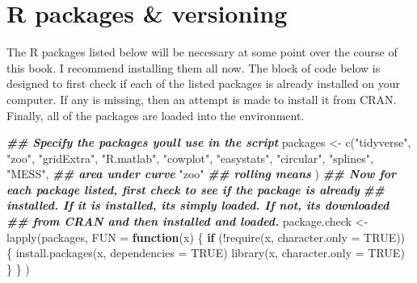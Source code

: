 \documentclass[
]{book}
\newenvironment{Shaded}{\begin{snugshade}}{\end{snugshade}}
\newcommand{\AttributeTok}[1]{\textcolor[rgb]{0.77,0.63,0.00}{#1}}
\newcommand{\ConstantTok}[1]{\textcolor[rgb]{0.00,0.00,0.00}{#1}}
\newcommand{\ControlFlowTok}[1]{\textcolor[rgb]{0.13,0.29,0.53}{\textbf{#1}}}
\newcommand{\DocumentationTok}[1]{\textcolor[rgb]{0.56,0.35,0.01}{\textbf{\textit{#1}}}}
\newcommand{\FunctionTok}[1]{\textcolor[rgb]{0.00,0.00,0.00}{#1}}
\newcommand{\NormalTok}[1]{#1}
\newcommand{\OtherTok}[1]{\textcolor[rgb]{0.56,0.35,0.01}{#1}}
\newcommand{\SpecialCharTok}[1]{\textcolor[rgb]{0.00,0.00,0.00}{#1}}
\newcommand{\StringTok}[1]{\textcolor[rgb]{0.31,0.60,0.02}{#1}}
\begin{document}
\hypertarget{r-packages-versioning}{%
\section{R packages \& versioning}\label{r-packages-versioning}}

The R packages listed below will be necessary at some point over the course of
this book. I recommend installing them all now. The block of code below is
designed to first check if each of the listed packages is already installed on
your computer. If any is missing, then an attempt is made to install it from
CRAN. Finally, all of the packages are loaded into the environment.

\begin{Shaded}
\begin{Highlighting}[]
\DocumentationTok{\#\# Specify the packages you\textquotesingle{}ll use in the script}
\NormalTok{packages }\OtherTok{\textless{}{-}} \FunctionTok{c}\NormalTok{(}\StringTok{"tidyverse"}\NormalTok{,}
              \StringTok{"zoo"}\NormalTok{,}
              \StringTok{"gridExtra"}\NormalTok{,}
              \StringTok{"R.matlab"}\NormalTok{,}
              \StringTok{"cowplot"}\NormalTok{,}
              \StringTok{"easystats"}\NormalTok{,}
              \StringTok{"circular"}\NormalTok{,}
              \StringTok{"splines"}\NormalTok{,}
              \StringTok{"MESS"}\NormalTok{, }\DocumentationTok{\#\# area under curve}
              \StringTok{"zoo"} \DocumentationTok{\#\# rolling means}
\NormalTok{)}
\DocumentationTok{\#\# Now for each package listed, first check to see if the package is already}
\DocumentationTok{\#\# installed. If it is installed, it\textquotesingle{}s simply loaded. If not, it\textquotesingle{}s downloaded }
\DocumentationTok{\#\# from CRAN and then installed and loaded.}
\NormalTok{package.check }\OtherTok{\textless{}{-}} \FunctionTok{lapply}\NormalTok{(packages,}
                        \AttributeTok{FUN =} \ControlFlowTok{function}\NormalTok{(x) \{}
                          \ControlFlowTok{if}\NormalTok{ (}\SpecialCharTok{!}\FunctionTok{require}\NormalTok{(x, }\AttributeTok{character.only =} \ConstantTok{TRUE}\NormalTok{)) \{}
                            \FunctionTok{install.packages}\NormalTok{(x, }\AttributeTok{dependencies =} \ConstantTok{TRUE}\NormalTok{)}
                            \FunctionTok{library}\NormalTok{(x, }\AttributeTok{character.only =} \ConstantTok{TRUE}\NormalTok{)}
\NormalTok{                          \}}
\NormalTok{                        \}}
\NormalTok{)}
\end{Highlighting}
\end{Shaded}
\end{document}

